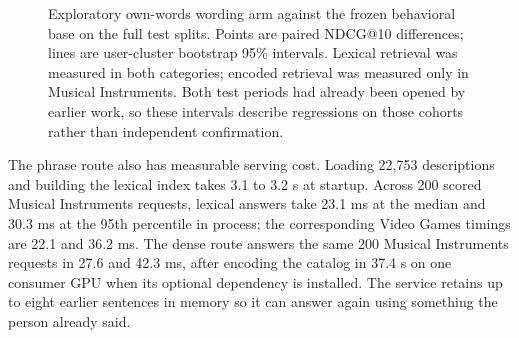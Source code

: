 \documentclass[11pt]{article}
\begin{document}
\begin{figure}[ht]
\centering
{}
\caption{Exploratory own-words wording arm against the frozen behavioral base on the full test splits. Points are paired NDCG@10 differences; lines are user-cluster bootstrap 95\% intervals. Lexical retrieval was measured in both categories; encoded retrieval was measured only in Musical Instruments. Both test periods had already been opened by earlier work, so these intervals describe regressions on those cohorts rather than independent confirmation.}
\label{fig:wording-arm}
\end{figure}

The phrase route also has measurable serving cost. Loading 22,753 descriptions and building the lexical index takes 3.1 to 3.2 s at startup. Across 200 scored Musical Instruments requests, lexical answers take 23.1 ms at the median and 30.3 ms at the 95th percentile in process; the corresponding Video Games timings are 22.1 and 36.2 ms. The dense route answers the same 200 Musical Instruments requests in 27.6 and 42.3 ms, after encoding the catalog in 37.4 s on one consumer GPU when its optional dependency is installed. The service retains up to eight earlier sentences in memory so it can answer again using something the person already said.
\end{document}
